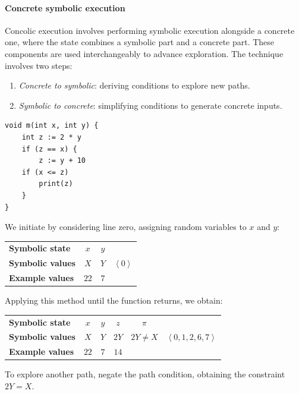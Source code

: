 \paragraph*{Concrete symbolic execution}
Concolic execution involves performing symbolic execution alongside a concrete one, where the state combines a symbolic part and a concrete part. 
These components are used interchangeably to advance exploration. 
The technique involves two steps:
\begin{enumerate}
    \item \textit{Concrete to symbolic}: deriving conditions to explore new paths.
    \item \textit{Symbolic to concrete}: simplifying conditions to generate concrete inputs.
\end{enumerate}
\begin{example}
    \begin{lstlisting}[style=Java]
void m(int x, int y) {
    int z := 2 * y
    if (z == x) {
        z := y + 10
    if (x <= z)
        print(z)
    }
}
    \end{lstlisting}
    We initiate by considering line zero, assigning random variables to $x$ and $y$:
    \begin{table}[H]
        \centering
        \begin{tabular}{l|ccc}
        \textbf{Symbolic state}  & $x$ & $y$ & \multirow{3}{*}{$\left\langle 0 \right\rangle $} \\ \cline{1-3}
        \textbf{Symbolic values} & $X$ & $Y$ &                    \\
        \textbf{Example values}  & $22$ & $7$ &                    
        \end{tabular}
    \end{table}
    Applying this method until the function returns, we obtain:
    \begin{table}[H]
        \centering
        \begin{tabular}{l|ccccc}
        \textbf{Symbolic state}  & $x$ & $y$ & $z$ & $\pi$ & \multirow{3}{*}{$\left\langle 0,1,2,6,7 \right\rangle $} \\ \cline{1-5}
        \textbf{Symbolic values} & $X$ & $Y$ & $2Y$ & $2Y \neq X$  &                 \\
        \textbf{Example values}  & $22$ & $7$ & $14$ &                  
        \end{tabular}
    \end{table}
    To explore another path, negate the path condition, obtaining the constraint $2Y = X$. 

\end{example}

